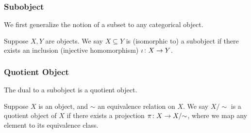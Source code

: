 \subsubsection*{Subobject}

\begin{remark}
    We first generalize the notion of a subset to any categorical object.
\end{remark}
\begin{definition}
    Suppose \(X,Y\) are objects.
    We say \(X \subseteq Y\) is (isomorphic to) a subobject
    if there exists an inclusion (injective homomorphism)
    \(\iota\colon X\to Y\).
\end{definition}



\subsubsection*{Quotient Object}

\begin{remark}
    The dual to a subobject is a quotient object.
\end{remark}
\begin{definition}
    Suppose \(X\) is an object, and \(\sim\) an equivalence relation on \(X\).
    We say \(X/{\sim}\) is a quotient object of \(X\)
    if there exists a projection \(\pi\colon X\to X/{\sim}\),
    where we map any element to its equivalence class.
\end{definition}


